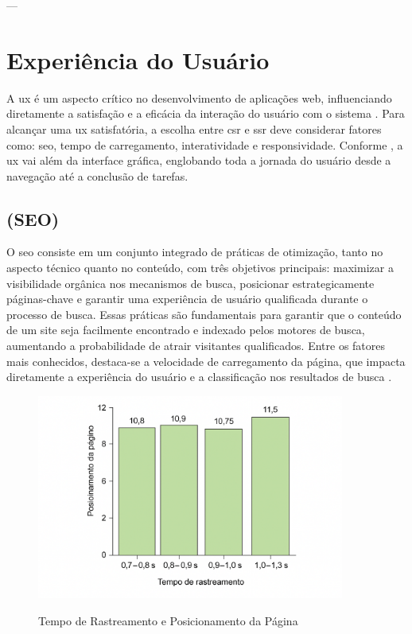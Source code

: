 ---

\section{Experiência do Usuário}
\label{sec:ux}
A \acrfull{ux} é um aspecto crítico no desenvolvimento de aplicações web, influenciando diretamente a satisfação e a eficácia da interação do usuário com o sistema \cite{atori2023}. Para alcançar uma \acrshort{ux} satisfatória, a escolha entre \acrshort{csr} e \acrshort{ssr} deve considerar fatores como: {\acrshort{seo}}, tempo de carregamento, interatividade e responsividade.
Conforme , a \acrshort{ux} vai além da interface gráfica, englobando toda a jornada do usuário desde a navegação até a conclusão de tarefas. 

\subsection{ (SEO)}
\label{sec:seo}

O \acrfull{seo} consiste em um conjunto integrado de práticas de otimização, tanto no aspecto técnico quanto no conteúdo, com três objetivos principais: maximizar a visibilidade orgânica nos mecanismos de busca, posicionar estrategicamente páginas-chave e garantir uma experiência de usuário qualificada durante o processo de busca. Essas práticas são fundamentais para garantir que o conteúdo de um site seja facilmente encontrado e indexado pelos motores de busca, aumentando a probabilidade de atrair visitantes qualificados. Entre os fatores mais conhecidos, destaca-se a velocidade de carregamento da página, que impacta diretamente a experiência do usuário e a classificação nos resultados de busca \cite{conor2022}.
\begin{figure}[H]
    \centering
    \caption{Tempo de Rastreamento e Posicionamento da Página}
    \includegraphics[width=0.9\textwidth]{media/rank_crawl_and_page_rank.png}
    \label{fig:rank_crawl_and_page_rank}
\end{figure}

